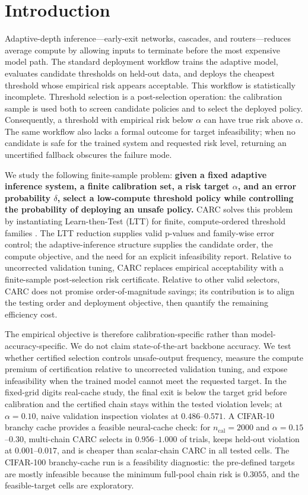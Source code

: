 \documentclass{ieeeaccess}
\begin{document}
\section{Introduction}

Adaptive-depth inference---early-exit networks, cascades, and routers---reduces average compute by allowing inputs to terminate before the most expensive model path. The standard deployment workflow trains the adaptive model, evaluates candidate thresholds on held-out data, and deploys the cheapest threshold whose empirical risk appears acceptable. This workflow is statistically incomplete. Threshold selection is a post-selection operation: the calibration sample is used both to screen candidate policies and to select the deployed policy. Consequently, a threshold with empirical risk below $\alpha$ can have true risk above $\alpha$. The same workflow also lacks a formal outcome for target infeasibility; when no candidate is safe for the trained system and requested risk level, returning an uncertified fallback obscures the failure mode.

We study the following finite-sample problem: \textbf{given a fixed adaptive inference system, a finite calibration set, a risk target $\alpha$, and an error probability $\delta$, select a low-compute threshold policy while controlling the probability of deploying an unsafe policy.} CARC solves this problem by instantiating Learn-then-Test (LTT) for finite, compute-ordered threshold families \cite{angelopoulos2025learn}. The LTT reduction supplies valid p-values and family-wise error control; the adaptive-inference structure supplies the candidate order, the compute objective, and the need for an explicit infeasibility report. Relative to uncorrected validation tuning, CARC replaces empirical acceptability with a finite-sample post-selection risk certificate. Relative to other valid selectors, CARC does not promise order-of-magnitude savings; its contribution is to align the testing order and deployment objective, then quantify the remaining efficiency cost.

The empirical objective is therefore calibration-specific rather than model-accuracy-specific. We do not claim state-of-the-art backbone accuracy. We test whether certified selection controls unsafe-output frequency, measure the compute premium of certification relative to uncorrected validation tuning, and expose infeasibility when the trained model cannot meet the requested target. In the fixed-grid digits real-cache study, the final exit is below the target grid before calibration and the certified chain stays within the tested violation levels; at $\alpha=0.10$, naive validation inspection violates at $0.486$--$0.571$. A CIFAR-10 branchy cache provides a feasible neural-cache check: for $n_{\mathrm{cal}}=2000$ and $\alpha=0.15$--$0.30$, multi-chain CARC selects in $0.956$--$1.000$ of trials, keeps held-out violation at $0.001$--$0.017$, and is cheaper than scalar-chain CARC in all tested cells. The CIFAR-100 branchy-cache run is a feasibility diagnostic: the pre-defined targets are mostly infeasible because the minimum full-pool chain risk is $0.3055$, and the feasible-target cells are exploratory.
\end{document}
